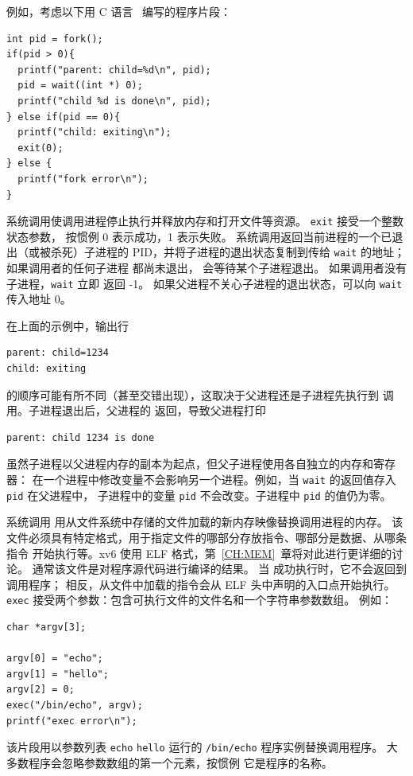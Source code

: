 例如，考虑以下用 C 语言~\cite{kernighan} 编写的程序片段：
\begin{lstlisting}[]
int pid = fork();
if(pid > 0){
  printf("parent: child=%d\n", pid);
  pid = wait((int *) 0);
  printf("child %d is done\n", pid);
} else if(pid == 0){
  printf("child: exiting\n");
  exit(0);
} else {
  printf("fork error\n");
}
\end{lstlisting}
系统调用使调用进程停止执行并释放内存和打开文件等资源。
\lstinline{exit} 接受一个整数状态参数，
按惯例 0 表示成功，1 表示失败。
系统调用返回当前进程的一个已退出（或被杀死）子进程的 PID，并将子进程的退出状态复制到传给 \lstinline{wait} 的地址；如果调用者的任何子进程
都尚未退出，
会等待某个子进程退出。
如果调用者没有子进程，\lstinline{wait} 立即
返回 -1。
如果父进程不关心子进程的退出状态，可以向
\lstinline{wait} 传入地址 0。

在上面的示例中，输出行
\begin{lstlisting}[]
parent: child=1234
child: exiting
\end{lstlisting}
的顺序可能有所不同（甚至交错出现），这取决于父进程还是子进程先执行到
调用。子进程退出后，父进程的
返回，导致父进程打印
\begin{lstlisting}[]
parent: child 1234 is done
\end{lstlisting}
虽然子进程以父进程内存的副本为起点，但父子进程使用各自独立的内存和寄存器：
在一个进程中修改变量不会影响另一个进程。例如，当
\lstinline{wait}
的返回值存入
\lstinline{pid}
在父进程中，
子进程中的变量
\lstinline{pid}
不会改变。子进程中
\lstinline{pid}
的值仍为零。

系统调用
用从文件系统中存储的文件加载的新内存映像替换调用进程的内存。
该文件必须具有特定格式，用于指定文件的哪部分存放指令、哪部分是数据、从哪条指令
开始执行等。xv6
使用 ELF 格式，第~\ref{CH:MEM}~章将对此进行更详细的讨论。
通常该文件是对程序源代码进行编译的结果。
当
成功执行时，它不会返回到调用程序；
相反，从文件中加载的指令会从 ELF 头中声明的入口点开始执行。
\lstinline{exec}
接受两个参数：包含可执行文件的文件名和一个字符串参数数组。
例如：
\begin{lstlisting}[]
char *argv[3];

argv[0] = "echo";
argv[1] = "hello";
argv[2] = 0;
exec("/bin/echo", argv);
printf("exec error\n");
\end{lstlisting}
该片段用以参数列表
\lstinline{echo}
\lstinline{hello} 运行的
\lstinline{/bin/echo}
程序实例替换调用程序。
大多数程序会忽略参数数组的第一个元素，按惯例
它是程序的名称。

